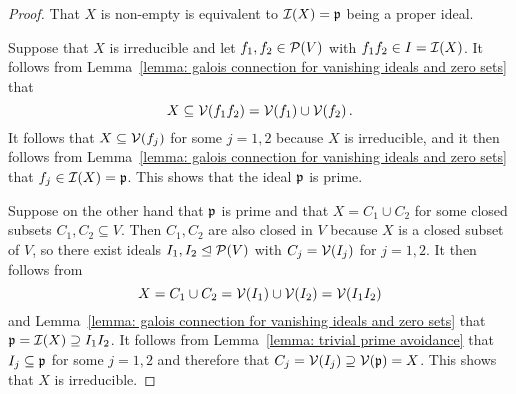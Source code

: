 \begin{proof}
  That $X$ is non-empty is equivalent to $\mathcal{I}(X) = \mathfrak{p}$ being a proper ideal.
  
  Suppose that $X$ is irreducible and let $f_1, f_2 \in \mathcal{P}(V)$ with $f_1 f_2 \in I = \mathcal{I}(X)$.
  It follows from Lemma~\ref{lemma: galois connection for vanishing ideals and zero sets} that
  \[
              X
    \subseteq \mathcal{V}(f_1 f_2)
    =         \mathcal{V}(f_1) \cup \mathcal{V}(f_2) \,.
  \]
  It follows that $X \subseteq \mathcal{V}(f_j)$ for some $j = 1,2$ because $X$ is irreducible, and it then follows from Lemma~\ref{lemma: galois connection for vanishing ideals and zero sets} that $f_j \in \mathcal{I}(X) = \mathfrak{p}$.
  This shows that the ideal $\mathfrak{p}$ is prime.
  
  Suppose on the other hand that $\mathfrak{p}$ is prime and that $X = C_1 \cup C_2$ for some closed subsets $C_1, C_2 \subseteq V$.
  Then $C_1, C_2$ are also closed in $V$ because $X$ is a closed subset of $V$, so there exist ideals $I_1, I_2 \trianglelefteq \mathcal{P}(V)$ with $C_j = \mathcal{V}(I_j)$ for $j = 1,2$.
  It then follows from
  \[
      X
    = C_1 \cup C_2
    = \mathcal{V}(I_1) \cup \mathcal{V}(I_2)
    = \mathcal{V}(I_1 I_2)
  \]
  and Lemma~\ref{lemma: galois connection for vanishing ideals and zero sets} that $\mathfrak{p} = \mathcal{I}(X) \supseteq I_1 I_2$.
  It follows from Lemma~\ref{lemma: trivial prime avoidance} that $I_j \subseteq \mathfrak{p}$ for some $j = 1,2$ and therefore that $C_j = \mathcal{V}(I_j) \supseteq \mathcal{V}(\mathfrak{p}) = X$.
  This shows that $X$ is irreducible.
\end{proof}


